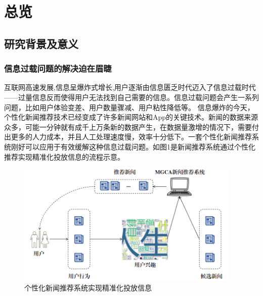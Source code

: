 \documentclass[withoutpreface,bwprint]{cumcmthesis} %
\begin{document}
	\section{总览}
	\subsection{研究背景及意义}
	\subsubsection{ 信息过载问题的解决迫在眉睫} 
	互联网高速发展,信息呈爆炸式增长,用户逐渐由信息匮乏时代迈入了信息过载时代——过量信息反而使得用户无法找到自己需要的信息。信息过载问题会产生一系列问题，比如用户体验变差、用户数量骤减、用户粘性降低等。
	信息爆炸的今天，个性化新闻推荐技术已经变成了许多新闻网站和App的关键技术。新闻的数据来源众多，可能一分钟就有成千上万条新的数据产生，在数据量激增的情况下，需要付出更多的人力成本，并且人工处理速度慢，效率十分低下。一套个性化新闻推荐系统刚好可以应用于有效缓解这种信息过载问题。如图1是新闻推荐系统通过个性化推荐实现精准化投放信息的流程示意。
	\begin{figure}[H]
		\centering
		\includegraphics[width=0.95\textwidth]{2}
		\caption{个性化新闻推荐系统实现精准化投放信息}
		\label{fig:circuit-diagcam}
	\end{figure}
\end{document}
